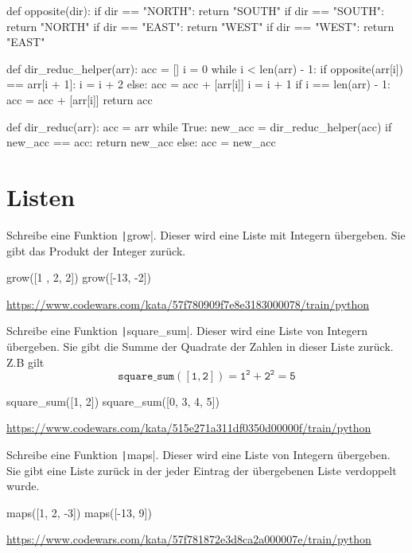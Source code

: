 \documentclass[class=scrartcl, crop=false]{standalone}
\newcommand{\expandpyconc}[1]{\expandafter\reallyexpandpyconc\expandafter{#1}}
\newcommand{\reallyexpandpyconc}[1]{\pyconc{exec(compile(open('#1', 'rb').read(), '#1', 'exec'))}}
\newenvironment{pyconcodeblck}[1]
{\newcommand{\snippetfile}{snippet-#1.py}
	\VerbatimEnvironment
	\begin{VerbatimOut}{\snippetfile}}
	{\end{VerbatimOut}
	\expandpyconc{\snippetfile}}
\begin{document}
\begin{pyconcodeblck}{listen}
def opposite(dir):
    if dir == "NORTH":
        return "SOUTH"
    if dir == "SOUTH":
        return "NORTH"
    if dir == "EAST":
        return "WEST"
    if dir == "WEST":
        return "EAST"

def dir_reduc_helper(arr):
    acc = []
    i = 0
    while i < len(arr) - 1:
        if opposite(arr[i]) == arr[i + 1]:
            i = i + 2
        else:
            acc = acc + [arr[i]]
            i = i + 1
    if i == len(arr) - 1:
        acc = acc + [arr[i]]
    return acc


def dir_reduc(arr):
    acc = arr
    while True:
        new_acc = dir_reduc_helper(acc)
        if new_acc == acc:
            return new_acc
        else:
            acc = new_acc
            
\end{pyconcodeblck}

\section{Listen}

\begin{aufgabe}
Schreibe eine Funktion \texttt|grow|. Dieser wird eine Liste mit Integern übergeben. Sie gibt das Produkt der Integer zurück.

\begin{pyconsole}
grow([1 , 2, 2])
grow([-13, -2])
\end{pyconsole}

\url{https://www.codewars.com/kata/57f780909f7e8e3183000078/train/python}
\end{aufgabe}

\begin{aufgabe}
Schreibe eine Funktion \texttt|square_sum|. Dieser wird eine Liste von Integern übergeben.  Sie gibt die Summe der Quadrate der Zahlen in dieser Liste zurück. Z.B gilt $$\mathtt{square\_sum([1, 2]) = 1^2 + 2^2 = 5 }$$

\begin{pyconsole}
square_sum([1, 2])
square_sum([0, 3, 4, 5])
\end{pyconsole}
\url{https://www.codewars.com/kata/515e271a311df0350d00000f/train/python}
\end{aufgabe}

\begin{aufgabe}
Schreibe eine Funktion \texttt|maps|. Dieser wird eine Liste von Integern übergeben. Sie gibt eine Liste zurück in der jeder Eintrag der übergebenen Liste verdoppelt wurde.
\begin{pyconsole}
maps([1, 2, -3])
maps([-13, 9])
\end{pyconsole}
\url{https://www.codewars.com/kata/57f781872e3d8ca2a000007e/train/python}
\end{aufgabe}
\end{document}
